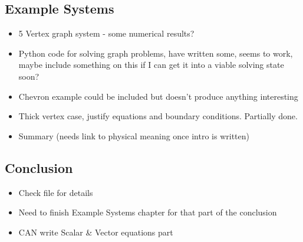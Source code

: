 \documentclass{article}
\begin{document}
\subsection*{Example Systems}
\begin{itemize}
	\item 5 Vertex graph system - some numerical results?
	\item Python code for solving graph problems, have written some, seems to work, maybe include something on this if I can get it into a viable solving state soon?
	\item Chevron example could be included but doesn't produce anything interesting
	\item Thick vertex case, justify equations and boundary conditions. Partially done.
	\item Summary (needs link to physical meaning once intro is written)
\end{itemize}

\subsection*{Conclusion}
\begin{itemize}
	\item Check file for details
	\item Need to finish Example Systems chapter for that part of the conclusion
	\item CAN write Scalar \& Vector equations part
\end{itemize}
\end{document}
